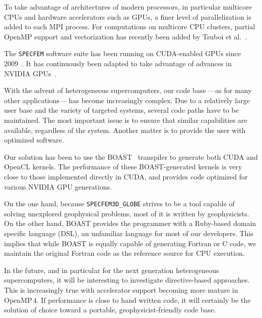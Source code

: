 To take advantage of architectures of modern processors, in particular multicore
CPUs and hardware accelerators such as GPUs, a finer level of parallelization is
added to each MPI process. For computations on multicore CPU clusters, partial
OpenMP support and vectorization has recently been added by Tsuboi et
al.~\cite{Tsuboi28022016}.

The \texttt{SPECFEM} software suite has been running on CUDA-enabled
GPUs since 2009~\cite{KoMiEr09}. It has continuously been adapted to take
advantage of advances in NVIDIA
GPUs~\cite{Komatitsch20107692, Rietmann2012}.

With the advent of heterogeneous supercomputers, our code base ---as for many
other applications--- has become increasingly complex. Due to a relatively large
user base and the variety of targeted systems, several code paths have to be
maintained. The most important issue is to ensure that similar capabilities are
available, regardless of the system. Another matter is to provide the user with
optimized software.

Our solution has been to use the BOAST~\cite{Cronsioe2013} transpiler to
generate both CUDA and OpenCL kernels. The performance of these BOAST-generated
kernels is very close to those implemented directly in CUDA, and provides code
optimized for various NVIDIA GPU generations.

On the one hand, because \texttt{SPECFEM3D\_GLOBE} strives to be a tool capable of solving
unexplored geophysical problems, most of it is written by geophysicists. On the
other hand, BOAST provides the programmer with a Ruby-based domain specific
language (DSL), an unfamiliar language for most of our developers. This implies
that while BOAST is equally capable of generating Fortran or C code, we maintain
the original Fortran code as the reference source for CPU execution.

In the future, and in particular for the next generation heterogeneous
supercomputers, it will be interesting to investigate
directive-based approaches. This is increasingly true with accelerator support
becoming more mature in OpenMP\,4. If performance is close to hand written code,
it will certainly be the solution of choice toward a portable, geophysicist-friendly code base.



